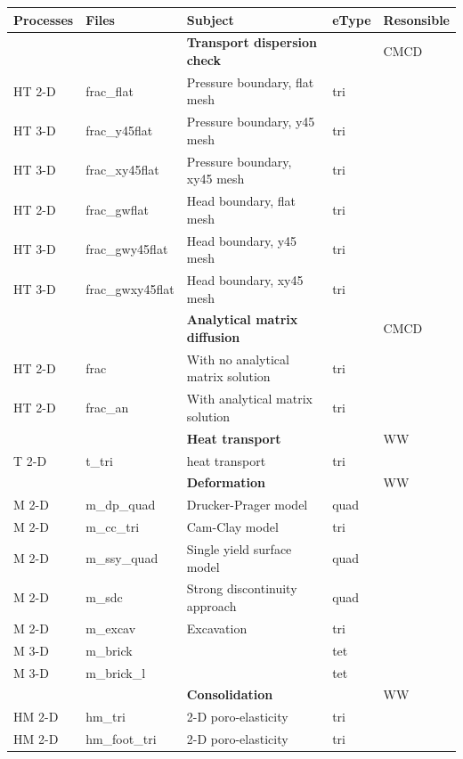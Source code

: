 \begin{center}
\begin{tabular*}{12.7cm}{|p{1.5cm}|p{1.8cm}|p{4.78cm}|p{1cm}|p{1.5cm}|} \hline
Processes & Files & Subject                & eType & Resonsible \\
\hline \hline
           &             & \textbf{Transport dispersion check} & & CMCD\\
HT  2-D    & frac\_flat &   Pressure boundary, flat mesh  & tri &\\
HT  3-D    & frac\_y45flat &   Pressure boundary, y45 mesh  & tri &\\
HT  3-D    & frac\_xy45flat &   Pressure boundary, xy45 mesh  & tri &\\
HT  2-D    & frac\_gwflat &   Head boundary, flat mesh  & tri &\\
HT  3-D    & frac\_gwy45flat &   Head boundary, y45 mesh  & tri &\\
HT  3-D    & frac\_gwxy45flat &   Head boundary, xy45 mesh  & tri &\\
\hline
           &             & \textbf{Analytical matrix diffusion} & & CMCD\\
HT  2-D    & frac & With no analytical matrix solution  & tri &\\
HT  2-D    & frac\_an & With analytical matrix solution  & tri &\\
\hline
           &             & \textbf{Heat transport} & & WW \\
T  2-D    & t\_tri & heat transport & tri & \\
\hline
           &             & \textbf{Deformation} & & WW \\
M 2-D     & m\_dp\_quad & Drucker-Prager model & quad & \\
M 2-D     & m\_cc\_tri & Cam-Clay model  & tri & \\
M 2-D     & m\_ssy\_quad & Single yield surface model  & quad & \\
M 2-D     & m\_sdc & Strong discontinuity approach  & quad & \\
M 2-D     & m\_excav & Excavation  & tri & \\
M 3-D     & m\_brick &   & tet & \\
M 3-D     & m\_brick\_l &   & tet & \\
\hline
           &             & \textbf{Consolidation} & & WW \\
HM 2-D     & hm\_tri & 2-D poro-elasticity & tri &  \\
HM 2-D     & hm\_foot\_tri & 2-D poro-elasticity & tri &  \\

\end{tabular*}
\end{center}
